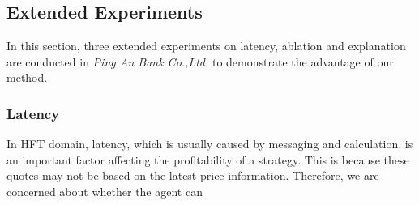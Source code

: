 \documentclass[conference]{IEEEtran}
\begin{document}
\subsection{Extended Experiments}
In this section, three extended experiments on latency, ablation and explanation are conducted in \textit{Ping An Bank Co.,Ltd.} to demonstrate the advantage of our method.

\subsubsection{Latency}
In HFT domain, latency, which is usually caused by messaging and calculation, is an important factor affecting the profitability of a strategy. This is because these quotes may not be based on the latest price information. Therefore, we are concerned about whether the agent can

\begin{table}[h]
\centering
\caption{THE RUNTIME OF METHODS.}
\label{table:runtime}
\end{table}
\end{document}
